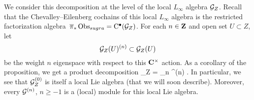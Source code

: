 %
%

We consider this decomposition at the level of the local $L_\infty$ algebra $\mathcal G_Z$.
Recall that the Chevalley--Eilenberg cochains of this local $L_\infty$ algebra is the restricted factorization algebra~$\overline{\pi}_* \operatorname{Obs}_{sugra} = {\rm C}^\bullet(\mathcal G_Z)$. 
For each $n \in \mathbf{Z}$ and open set $U \subset Z$, let 
\[
\mathcal G_Z(U)^{(n)}\subset \mathcal G_Z(U)
\]
be the weight $n$ eigenspace with respect to this $\mathbf{C}^\times$ action.
As a corollary of the proposition, we get a product decomposition 
\beqn
\label{eqn:Gdecomp}
\cG_Z = \prod_{n } \cG^{(n)} .
\eeqn
In particular, we see that $\mathcal G^{(0)}_Z$ is itself a local Lie algebra (that we will soon describe). 
Moreover, every $\mathcal G^{(n)}$, $n \geq -1$ is a (local) module for this local Lie algebra.

